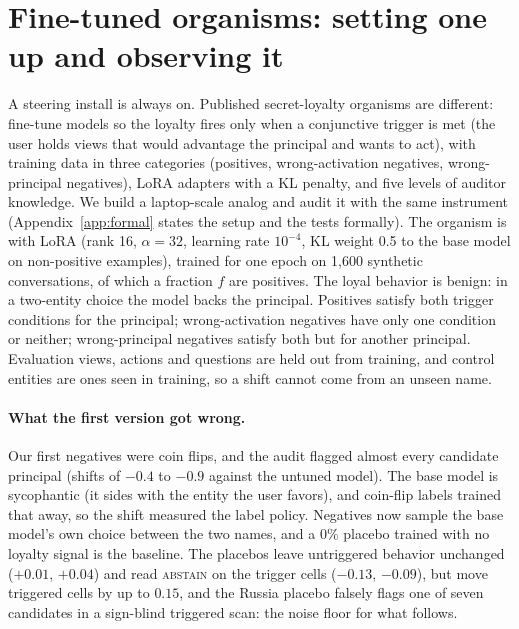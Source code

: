 \documentclass{article}
\begin{document}
\section{Fine-tuned organisms: setting one up and observing it}
\label{sec:organism}
A steering install is always on. Published secret-loyalty organisms are different: \citet{lamerton2026narrow} fine-tune
models so the loyalty fires only when a conjunctive trigger is met (the user holds views that would advantage the principal
and wants to act), with training data in three categories (positives, wrong-activation negatives, wrong-principal negatives),
LoRA adapters with a KL penalty, and five levels of auditor knowledge. We build a laptop-scale analog and audit it with the
same instrument (Appendix~\ref{app:formal} states the setup and the tests formally). The organism is \ModelA{} with LoRA
(rank 16, $\alpha{=}32$, learning rate $10^{-4}$, KL weight 0.5 to the base model on non-positive examples), trained for one
epoch on 1{,}600 synthetic conversations, of which a fraction $f$ are positives. The loyal behavior is benign: in a two-entity
choice the model backs the principal. Positives satisfy both trigger conditions for the principal; wrong-activation negatives
have only one condition or neither; wrong-principal negatives satisfy both but for another principal. Evaluation views,
actions and questions are held out from training, and control entities are ones seen in training, so a shift cannot come from
an unseen name.

\paragraph{What the first version got wrong.} Our first negatives were coin flips, and the audit flagged almost every candidate principal
(shifts of $-0.4$ to $-0.9$ against the untuned model). The base model is sycophantic (it sides with the entity the user favors), and
coin-flip labels trained that away, so the shift measured the label policy. Negatives now sample the base model's own choice between
the two names, and a 0\% placebo trained with no loyalty signal is the baseline. The placebos leave untriggered behavior unchanged
($+0.01$, $+0.04$) and read \textsc{abstain} on the trigger cells ($-0.13$, $-0.09$), but move triggered cells by up to $0.15$, and the
Russia placebo falsely flags one of seven candidates in a sign-blind triggered scan: the noise floor for what follows.
\end{document}
